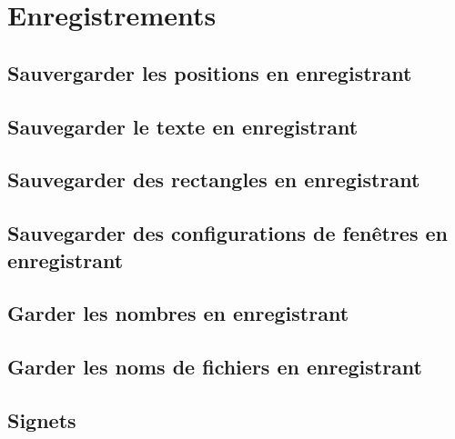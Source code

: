 \chapter{Enregistrements}
\section{Sauvergarder les positions en enregistrant}
\section{Sauvegarder le texte en enregistrant}
\section{Sauvegarder des rectangles en enregistrant}
\section{Sauvegarder des configurations de fenêtres en
  enregistrant} 
\section{Garder les nombres en enregistrant}
\section{Garder les noms de fichiers en enregistrant}
\section{Signets}